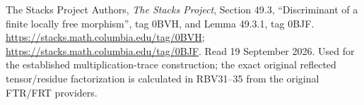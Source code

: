 The Stacks Project Authors, \emph{The Stacks Project},
Section 49.3, ``Discriminant of a finite locally free morphism'',
tag 0BVH, and Lemma 49.3.1, tag 0BJF.
\url{https://stacks.math.columbia.edu/tag/0BVH};
\url{https://stacks.math.columbia.edu/tag/0BJF}.
Read 19 September 2026. Used for the established multiplication-trace
construction; the exact original reflected tensor/residue factorization
is calculated in RBV31--35 from the original FTR/FRT providers.
